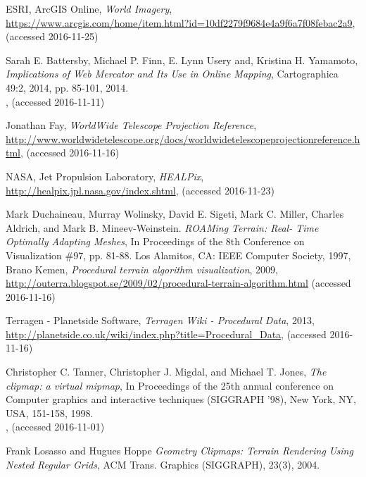\begin{thebibliography}{99}
  ESRI, ArcGIS Online,
  \emph{World Imagery},
  \\
  \url{https://www.arcgis.com/home/item.html?id=10df2279f9684e4a9f6a7f08febac2a9},
  (accessed 2016-11-25)

  Sarah E. Battersby, Michael P. Finn, E. Lynn Usery and, Kristina H. Yamamoto,
  \emph{Implications of Web Mercator and Its Use in Online Mapping},
  Cartographica 49:2, 2014, pp. 85-101,
  2014. \\
  ,
  (accessed 2016-11-11)

  Jonathan Fay,
  \emph{WorldWide Telescope Projection Reference},
  \\
  \url{http://www.worldwidetelescope.org/docs/worldwidetelescopeprojectionreference.html},
  (accessed 2016-11-16)

  NASA, Jet Propulsion Laboratory,
  \emph{HEALPix},
  \\
  \url{http://healpix.jpl.nasa.gov/index.shtml},
  (accessed 2016-11-23)

  Mark Duchaineau, Murray Wolinsky, David E. Sigeti, Mark C. Miller, Charles Aldrich, and Mark B. Mineev-Weinstein.
  \emph{ROAMing Terrain: Real- Time Optimally Adapting Meshes},
  In Proceedings of the 8th Conference on Visualization \#97, pp. 81-88. Los Alamitos, CA: IEEE Computer Society,
  1997, \\

  Brano Kemen,
  \emph{Procedural terrain algorithm visualization},
  2009, \\
  \url{http://outerra.blogspot.se/2009/02/procedural-terrain-algorithm.html}
  (accessed 2016-11-16)

  Terragen - Planetside Software,
  \emph{Terragen Wiki - Procedural Data},
  2013, \\
  \url{http://planetside.co.uk/wiki/index.php?title=Procedural_Data},
  (accessed 2016-11-16)

  Christopher C. Tanner, Christopher J. Migdal, and Michael T. Jones,
  \emph{The clipmap: a virtual mipmap},
  In Proceedings of the 25th annual conference on Computer graphics and interactive techniques (SIGGRAPH '98),
  New York, NY, USA, 151-158,
  1998. \\
  ,
  (accessed 2016-11-01)

  Frank Losasso and Hugues Hoppe
  \emph{Geometry Clipmaps: Terrain Rendering Using Nested Regular Grids},
  ACM Trans. Graphics (SIGGRAPH), 23(3),
  2004.


\end{thebibliography}
